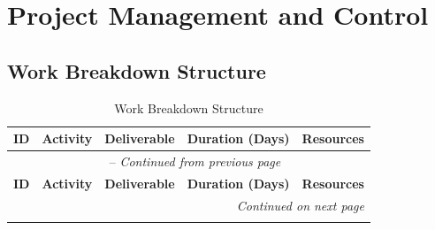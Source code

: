 \chapter{Project Management and Control}
\section{Work Breakdown Structure}
\begin{longtable}{|c|m{4cm}|m{4cm}|>{\centering}m{1.6cm}|m{3.5cm}|}
	\caption{Work Breakdown Structure}
	\label{table:primary} \\
	\hline \textbf{ID} & \textbf{Activity} & \textbf{Deliverable} & \textbf{Duration (Days)} & \textbf{Resources} \\ \hline
	\endfirsthead
	\multicolumn{5}{c}{\tablename\ \thetable\ -- \textit{Continued from previous page}} \\ \hline
	\textbf{ID} & \textbf{Activity} & \textbf{Deliverable} & \textbf{Duration (Days)} & \textbf{Resources} \\ \hline
	\endhead 
	\multicolumn{5}{r}{\textit{Continued on next page}} \\
	\endfoot \hline
	\endlastfoot


\end{longtable}
